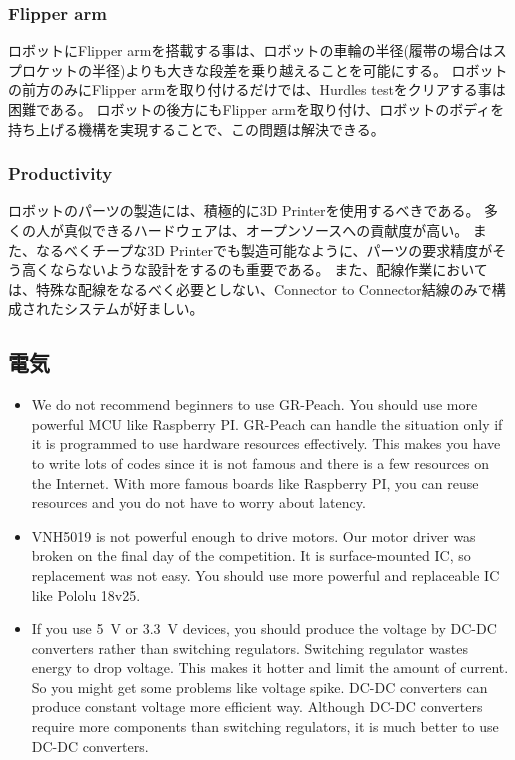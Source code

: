 \documentclass[journal]{IEEEtran}
\begin{document}
\subsubsection{Flipper arm}
ロボットにFlipper armを搭載する事は、ロボットの車輪の半径(履帯の場合はスプロケットの半径)よりも大きな段差を乗り越えることを可能にする。
ロボットの前方のみにFlipper armを取り付けるだけでは、Hurdles testをクリアする事は困難である。
ロボットの後方にもFlipper armを取り付け、ロボットのボディを持ち上げる機構を実現することで、この問題は解決できる。

\subsubsection{Productivity}
ロボットのパーツの製造には、積極的に3D Printerを使用するべきである。
多くの人が真似できるハードウェアは、オープンソースへの貢献度が高い。
また、なるべくチープな3D Printerでも製造可能なように、パーツの要求精度がそう高くならないような設計をするのも重要である。
また、配線作業においては、特殊な配線をなるべく必要としない、Connector to Connector結線のみで構成されたシステムが好ましい。

\subsection{電気}
\begin{itemize}
    \item We do not recommend beginners to use GR-Peach.
    You should use more powerful MCU like Raspberry PI.
    GR-Peach can handle the situation only if it is programmed to use hardware resources effectively.
    This makes you have to write lots of codes since it is not famous and there is a few resources on the Internet.
    With more famous boards like Raspberry PI, you can reuse resources and you do not have to worry about latency.
    \item VNH5019 is not powerful enough to drive motors.
    Our motor driver was broken on the final day of the competition.
    It is surface-mounted IC, so replacement was not easy.
    You should use more powerful and replaceable IC like Pololu 18v25.
    \item If you use \SI{5}{\V} or \SI{3.3}{\V} devices, you should produce the voltage by DC-DC converters rather than switching regulators.
    Switching regulator wastes energy to drop voltage.
    This makes it hotter and limit the amount of current.
    So you might get some problems like voltage spike.
    DC-DC converters can produce constant voltage more efficient way.
    Although DC-DC converters require more components than switching regulators, it is much better to use DC-DC converters.
\end{itemize}
\end{document}
